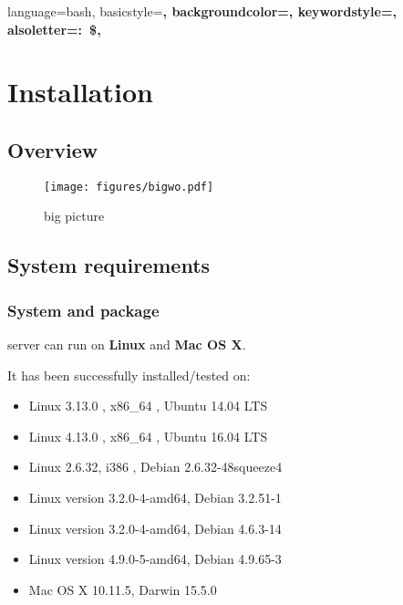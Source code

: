{language=bash,
basicstyle=\scriptsize\ttfamily\color{white}\bfseries,
backgroundcolor=\color{charcoal},
keywordstyle=\color{white},
alsoletter={:~\$},
}

\chapter{Installation}

\section{Overview}

\begin{figure}[!h]
	\centering
	\texttt{[image: figures/bigwo.pdf]}
	\caption{\webobs big picture}
\end{figure}

\section{System requirements}

\subsection{System and package}

\webobs server can run on \textbf{Linux} and \textbf{Mac OS X}.

It has been successfully installed/tested on:
\begin{itemize}
\item   Linux 3.13.0 , x86\_64 , Ubuntu 14.04 LTS
\item   Linux 4.13.0 , x86\_64 , Ubuntu 16.04 LTS
\item   Linux 2.6.32, i386 , Debian 2.6.32-48squeeze4
\item   Linux version 3.2.0-4-amd64, Debian 3.2.51-1
\item   Linux version 3.2.0-4-amd64, Debian 4.6.3-14
\item   Linux version 4.9.0-5-amd64, Debian 4.9.65-3
\item   Mac OS X 10.11.5, Darwin 15.5.0
\end{itemize}


